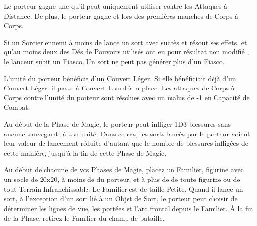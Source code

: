 \endpricelist

\armytalismans

\startpricelist

Le porteur gagne une  qu'il peut uniquement utiliser contre les Attaques à Distance. De plus, le porteur gagne  et  lors des premières manches de Corps à Corps.

Si un Sorcier ennemi à moins de  lance un sort avec succès et résout ses effets, et qu'au moins deux des Dés de Pouvoirs utilisés ont eu pour résultat non modifié , le lanceur subit un Fiasco. Un sort ne peut pas générer plus d'un Fiasco.

\endpricelist

\armyenchanteditems

\startpricelist

L'unité du porteur bénéficie d'un Couvert Léger. Si elle bénéficiait déjà d'un Couvert Léger, il passe à Couvert Lourd à la place. Les attaques de Corps à Corps contre l'unité du porteur sont résolues avec un malus de -1 en Capacité de Combat.

\endpricelist

\armyarcaneitems

\startpricelist

Au début de la Phase de Magie, le porteur peut infliger 1D3 blessures sans aucune sauvegarde à son unité. Dans ce cas, les sorts lancés par le porteur voient leur valeur de lancement réduite d'autant que le nombre de blessures infligées de cette manière, jusqu'à la fin de cette Phase de Magie.

Au début de chacune de vos Phases de Magie, placez un Familier, figurine avec un socle de \unit{20x20}{\milli\meter}, à moins de  du porteur, et à plus de  de toute figurine ou de tout Terrain Infranchissable. Le Familier est de taille Petite. Quand il lance un sort, à l'exception d'un sort lié à un Objet de Sort, le porteur peut choisir de déterminer les lignes de vue, les portées et l'arc frontal depuis le Familier. À la fin de la Phase, retirez le Familier du champ de bataille.

\endpricelist

\armymagicalbanners

\startpricelist

